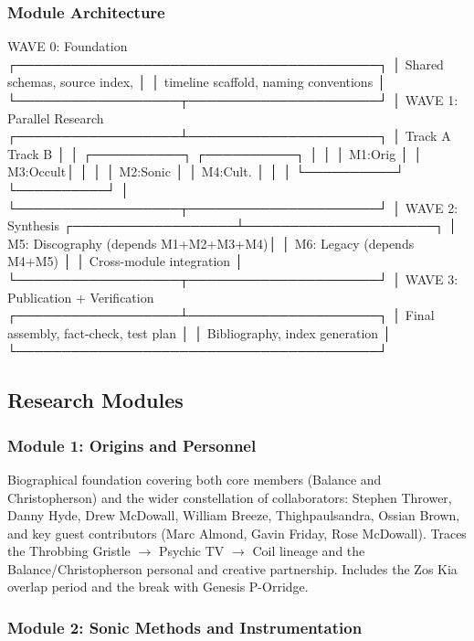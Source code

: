 \documentclass[11pt,letterpaper]{article}
\begin{document}
\subsubsection{Module Architecture}

\begin{asciibox}
    WAVE 0: Foundation
    ┌────────────────────────────────────────┐
    │  Shared schemas, source index,         │
    │  timeline scaffold, naming conventions │
    └──────────────────┬─────────────────────┘
                       │
    WAVE 1: Parallel Research
    ┌──────────────────┴─────────────────────┐
    │  Track A           Track B             │
    │  ┌──────────┐     ┌──────────┐         │
    │  │ M1:Orig  │     │ M3:Occult│         │
    │  │ M2:Sonic │     │ M4:Cult. │         │
    │  └──────────┘     └──────────┘         │
    └──────────────────┬─────────────────────┘
                       │
    WAVE 2: Synthesis
    ┌──────────────────┴─────────────────────┐
    │  M5: Discography (depends M1+M2+M3+M4)│
    │  M6: Legacy (depends M4+M5)            │
    │  Cross-module integration              │
    └──────────────────┬─────────────────────┘
                       │
    WAVE 3: Publication + Verification
    ┌──────────────────┴─────────────────────┐
    │  Final assembly, fact-check, test plan │
    │  Bibliography, index generation        │
    └────────────────────────────────────────┘
\end{asciibox}

\subsection{Research Modules}

\subsubsection{Module 1: Origins and Personnel}

Biographical foundation covering both core members (Balance and Christopherson) and the wider constellation of collaborators: Stephen Thrower, Danny Hyde, Drew McDowall, William Breeze, Thighpaulsandra, Ossian Brown, and key guest contributors (Marc Almond, Gavin Friday, Rose McDowall). Traces the Throbbing Gristle $\rightarrow$ Psychic TV $\rightarrow$ Coil lineage and the Balance/Christopherson personal and creative partnership. Includes the Zos Kia overlap period and the break with Genesis P-Orridge.

\subsubsection{Module 2: Sonic Methods and Instrumentation}
\end{document}
